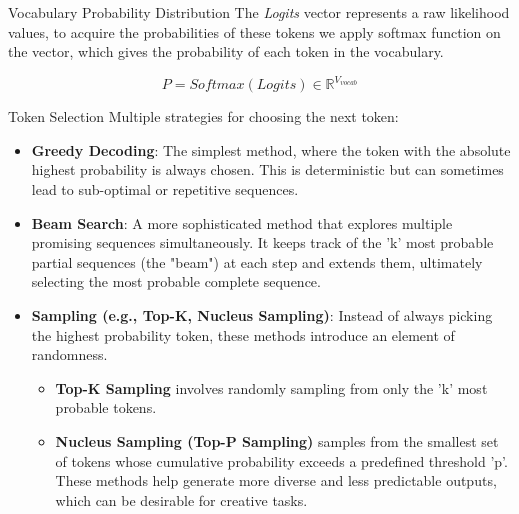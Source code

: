 \documentclass{beamer}
\begin{document}
\begin{frame}{Vocabulary Probability Distribution}
  The \textit{Logits} vector represents a raw likelihood values, to acquire the probabilities of these
  tokens we apply softmax function on the vector, which gives the probability of each token in the vocabulary.

  $$P = Softmax(Logits) \in \mathbb{R}^{V_{vocab}}$$

\end{frame}

\begin{frame}{Token Selection}
  Multiple strategies for choosing the next token:
  \begin{itemize}
    \item \textbf{Greedy Decoding}:  The simplest method, where the token with the absolute highest probability
     is always chosen. This is deterministic but can sometimes lead to sub-optimal or repetitive sequences.
     \item \textbf{Beam Search}: A more sophisticated method that explores multiple promising sequences simultaneously. It keeps track of the 'k' most probable partial sequences (the "beam") at each step and extends them, 
     ultimately selecting the most probable complete sequence.\cite{analyticsvidhya_beam_search}
     \item \textbf{Sampling (e.g., Top-K, Nucleus Sampling)}: Instead of always picking the highest probability token, these methods introduce an element of randomness.
        \begin{itemize}
            \item \textbf{Top-K Sampling} involves randomly sampling from only the 'k' most probable tokens.
            \item \textbf{Nucleus Sampling (Top-P Sampling)} samples from the smallest set of tokens whose cumulative probability exceeds a predefined threshold 'p'. These methods help generate more diverse and less predictable outputs, which can be desirable for creative tasks.
        \end{itemize}
  \end{itemize}
\end{frame}
\end{document}
